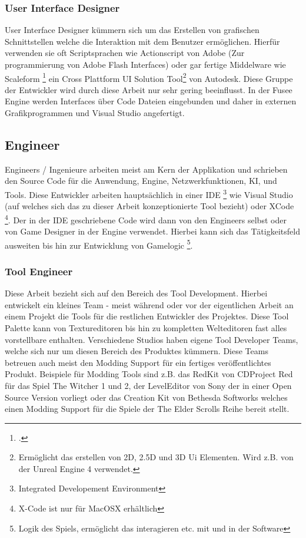 \documentclass[pagesize, paper=a4, fontsize=12pt,titlepage=true, headings=small, headnosepline, abstractoff, liststotoc, nochapterprefix, plainheadsepline, twoside]{scrreprt}
\begin{document}
\subsubsection{User Interface Designer}
User Interface Designer kümmern sich um das Erstellen von grafischen Schnittstellen welche die Interaktion mit dem Benutzer ermöglichen. Hierfür verwenden sie oft Scriptsprachen wie Actionscript von Adobe (Zur programmierung von Adobe Flash Interfaces) oder gar fertige Middelware wie Scaleform \footcite{AutodeskScale2014} ein Cross Plattform UI Solution Tool\footnote{Ermöglicht das erstellen von 2D, 2.5D und 3D Ui Elementen. Wird z.B. von der Unreal Engine 4 verwendet.} von Autodesk. Diese Gruppe der Entwickler wird durch diese Arbeit nur sehr gering beeinflusst. In der Fusee Engine werden Interfaces über Code Dateien eingebunden und daher in externen Grafikprogrammen und Visual Studio angefertigt.

\subsection{Engineer}
Engineers / Ingenieure arbeiten meist am Kern der Applikation und schrieben den Source Code für die Anwendung, Engine, Netzwerkfunktionen, KI, und Tools. Diese Entwickler arbeiten hauptsächlich in einer IDE \footnote{Integrated Developement Environment} wie Visual Studio (auf welches sich das zu dieser Arbeit konzeptionierte Tool bezieht) oder XCode \footnote{X-Code ist nur für MacOSX erhältlich}. Der in der IDE geschriebene Code wird dann von den Engineers selbst oder von Game Designer in der Engine verwendet. Hierbei kann sich das Tätigkeitsfeld ausweiten bis hin zur Entwicklung von Gamelogic \footnote{Logik des Spiels, ermöglicht das interagieren etc. mit und in der Software}.
\subsubsection{Tool Engineer}
Diese Arbeit bezieht sich auf den Bereich des Tool Development. Hierbei entwickelt ein kleines Team - meist während oder vor der eigentlichen Arbeit an einem Projekt die Tools für die restlichen Entwickler des Projektes. Diese Tool Palette kann von Textureditoren bis hin zu kompletten Welteditoren fast alles vorstellbare enthalten. Verschiedene Studios haben eigene Tool Developer Teams, welche sich nur um diesen Bereich des Produktes kümmern. Diese Teams betreuen auch meist den Modding Support für ein fertiges veröffentlichtes Produkt. Beispiele für Modding Tools sind z.B. das RedKit von CDProject Red für das Spiel The Witcher 1 und 2, der LevelEditor von Sony der in einer Open Source Version vorliegt oder das Creation Kit von Bethesda Softworks welches einen Modding Support für die Spiele der The Elder Scrolls Reihe bereit stellt.
\end{document}
